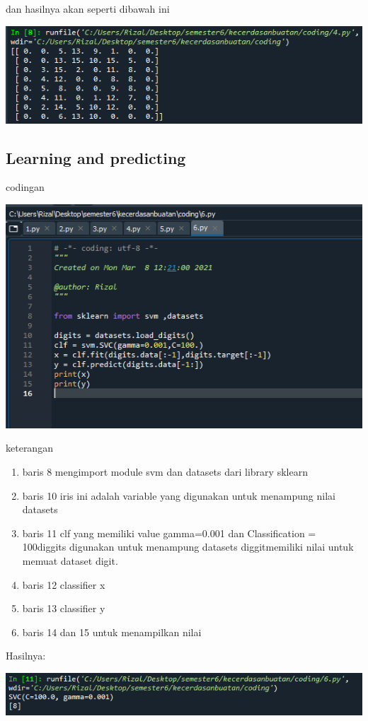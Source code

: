 \documentclass{article}
\begin{document}
dan hasilnya akan seperti dibawah ini

\begin{center}
    \includegraphics[width=.8\textwidth]{figures/1184033/chapter1/9.PNG}
\end{center}


\subsection{Learning and predicting}

codingan

\begin{center}
    \includegraphics[width=.8\textwidth]{figures/1184033/chapter1/12.PNG}
\end{center}

keterangan
\begin{enumerate}
\item baris 8 mengimport module svm dan datasets dari library sklearn
\item baris 10 iris ini adalah variable yang digunakan untuk menampung nilai datasets
\item baris 11 clf yang memiliki value gamma=0.001 dan Classification = 100diggits digunakan untuk menampung datasets diggitmemiliki nilai untuk memuat dataset digit.
\item baris 12 classifier x
\item baris 13 classifier y
\item baris 14 dan 15 untuk menampilkan nilai
\end{enumerate}
Hasilnya:
\begin{center}
    \includegraphics[width=.8\textwidth]{figures/1184033/chapter1/13.PNG}
\end{center}
\end{document}
